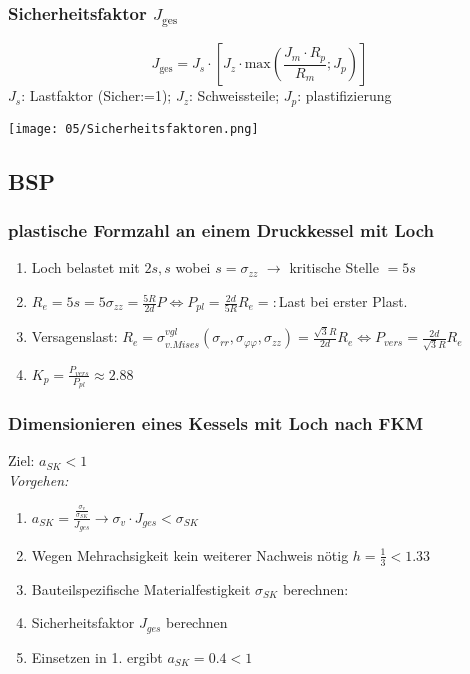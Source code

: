         \subsubsection{Sicherheitsfaktor $J_{\textrm{ges}}$}
        \small\[J_{\textrm{ges}}= J_s \cdot \left[ J_z \cdot \textrm{max}\left(\frac{J_m \cdot R_p}{R_m}; J_p \right) \right] \]\normalsize
        $J_s$: Lastfaktor (Sicher:=1); $J_z$: Schweissteile; $J_p$: plastifizierung
        \begin{center}
            \texttt{[image: 05/Sicherheitsfaktoren.png]}
        \end{center}
    
    \subsection{BSP}
        \subsubsection{plastische Formzahl an einem Druckkessel mit Loch}
            \begin{enumerate}
                \item Loch belastet mit $2s,s$ wobei $s=\sigma_{zz}$ $\rightarrow$ kritische Stelle $=5s$
                \item $R_e=5s=5\sigma_{zz}=\frac{5R}{2d}P \Leftrightarrow P_{pl}=\frac{2d}{5R}R_e=:$Last bei erster Plast.
                \item Versagenslast: $R_e=\sigma_{v.Mises}^{vgl}(\sigma_{rr},\sigma_{\varphi\varphi},\sigma_{zz})=\frac{\sqrt{3}R}{2d}R_e \Leftrightarrow P_{vers}=\frac{2d}{\sqrt{3}R}R_e$
                \item $K_p=\frac{P_{vers}}{P_{pl}}\approx 2.88$
            \end{enumerate}
            
        \subsubsection{Dimensionieren eines Kessels mit Loch nach FKM}
        Ziel: $ a_{SK}<1 $
        \\\textit{Vorgehen:}
        \vspace{-3mm}
        \begin{enumerate}
            \item $ a_{{SK}} = \frac{\frac{\sigma_v}{\sigma_{{SK}}}}{J_{ges}}  \rightarrow  \sigma_v \cdot J_{ges} < \sigma_{{SK}} $
            \item Wegen Mehrachsigkeit kein weiterer Nachweis nötig
            $ h = \frac{1}{3} < 1.33$ 
            \item Bauteilspezifische Materialfestigkeit $ \sigma_{SK} $ berechnen:
            \item Sicherheitsfaktor $J_{ges}$ berechnen
            \item Einsetzen in 1. ergibt $a_{SK}=0.4<1$
        \end{enumerate}
        
        
        
        
        
        
        
